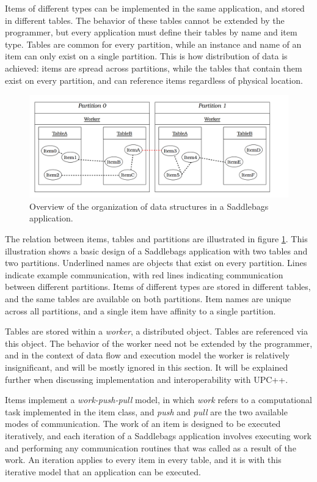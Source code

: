 \documentclass{uit-report}
\begin{document}
Items of different types can be implemented in the same application, and stored in different tables. The behavior of these tables cannot be extended by the programmer, but every application must define their tables by name and item type. Tables are common for every partition, while an instance and name of an item can only exist on a single partition. This is how distribution of data is achieved: items are spread across partitions, while the tables that contain them exist on every partition, and can reference items regardless of physical location.

\begin{figure}[h]
\centering
\includegraphics[width=15cm]{illustrations/png/basicmodel.png}
\caption{Overview of the organization of data structures in a Saddlebags application.}
\label{fig:basicmodel}
\end{figure}

The relation between items, tables and partitions are illustrated in figure \ref{fig:basicmodel}. This illustration shows a basic design of a Saddlebags application with two tables and two partitions. Underlined names are objects that exist on every partition. Lines indicate example communication, with red lines indicating communication between different partitions. Items of different types are stored in different tables, and the same tables are available on both partitions. Item names are unique across all partitions, and a single item have affinity to a single partition. 

Tables are stored within a \emph{worker}, a distributed object. Tables are referenced via this object. The behavior of the worker need not be extended by the programmer, and in the context of data flow and execution model the worker is relatively insignificant, and will be mostly ignored in this section. It will be explained further when discussing implementation and interoperability with UPC++.

Items implement a \emph{work-push-pull} model, in which \emph{work} refers to a computational task implemented in the item class, and \emph{push} and \emph{pull} are the two available modes of communication. The work of an item is designed to be executed iteratively, and each iteration of a Saddlebags application involves executing work and performing any communication routines that was called as a result of the work. An iteration applies to every item in every table, and it is with this iterative model that an application can be executed. 
\end{document}
